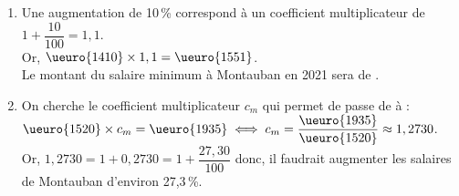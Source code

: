 \begin{corrige}
\begin{enumerate}
         \begin{enumerate}
            \item Une augmentation de 10\,\% correspond à un coefficient multiplicateur de $1+\dfrac{10}{100} =1,1$. \\ [1mm]
               Or, $\ueuro{1410}\times1,1 =\ueuro{1551}$. \\
               {\blue Le montant du salaire minimum à Montauban en 2021 sera de }.
            \item On cherche le coefficient multiplicateur $c_m$ qui permet de passe de  à  : \\ [1mm]
                $\ueuro{1520}\times c_m =\ueuro{1935} \iff c_m =\dfrac{\ueuro{1935}}{\ueuro{1520}} \approx1,2730$. \\ [2mm]
                Or, $1,2730 =1+0,2730 =1+\dfrac{27,30}{100}$ donc, {\blue il faudrait augmenter les salaires de Montauban d'environ 27,3\,\%}.
         \end{enumerate}
   \end{enumerate}  
\end{corrige}

\pagebreak


